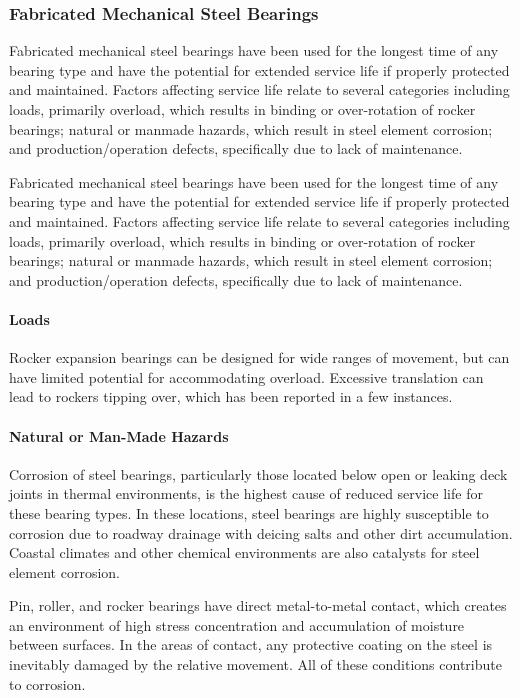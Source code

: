 \subsubsection{Fabricated Mechanical Steel Bearings}

Fabricated mechanical steel bearings have been used for the longest time of any bearing type and have the
potential for extended service life if properly protected and maintained. Factors affecting service life relate to several
categories including loads, primarily overload, which results in binding or over-rotation of rocker bearings; natural
or manmade hazards, which result in steel element corrosion; and production/operation defects, specifically due to
lack of maintenance.

Fabricated mechanical steel bearings have been used for the longest time of any bearing type and have the
potential for extended service life if properly protected and maintained. Factors affecting service life relate to several
categories including loads, primarily overload, which results in binding or over-rotation of rocker bearings; natural
or manmade hazards, which result in steel element corrosion; and production/operation defects, specifically due to
lack of maintenance.

\paragraph{Loads}
Rocker expansion bearings can be designed for wide ranges of movement, but can have limited potential for
accommodating overload. Excessive translation can lead to rockers tipping over, which has been reported in a few
instances.

\paragraph{Natural or Man-Made Hazards}
Corrosion of steel bearings, particularly those located below open or leaking deck joints in thermal environments,
is the highest cause of reduced service life for these bearing types. In these locations, steel bearings are highly
susceptible to corrosion due to roadway drainage with deicing salts and other dirt accumulation. Coastal climates and
other chemical environments are also catalysts for steel element corrosion.

Pin, roller, and rocker bearings have direct metal-to-metal contact, which creates an environment of high stress
concentration and accumulation of moisture between surfaces. In the areas of contact, any protective coating on the
steel is inevitably damaged by the relative movement. All of these conditions contribute to corrosion.

